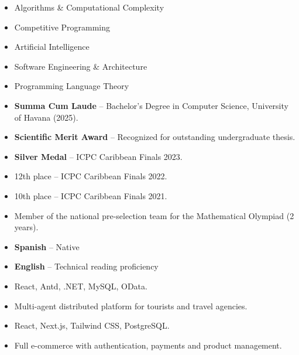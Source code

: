 

\begin{itemize}
    \item Algorithms \& Computational Complexity
    \item Competitive Programming
    \item Artificial Intelligence
    \item Software Engineering \& Architecture
    \item Programming Language Theory
\end{itemize}


\begin{itemize}
    \item \textbf{Summa Cum Laude} -- Bachelor's Degree in Computer Science, University of Havana (2025).
    \item \textbf{Scientific Merit Award} -- Recognized for outstanding undergraduate thesis.
    \item \textbf{Silver Medal} -- ICPC Caribbean Finals 2023.
    \item 12th place -- ICPC Caribbean Finals 2022.
    \item 10th place -- ICPC Caribbean Finals 2021.
    \item Member of the national pre-selection team for the Mathematical Olympiad (2 years).
\end{itemize}


\begin{itemize}
    \item \textbf{Spanish} -- Native
    \item \textbf{English} -- Technical reading proficiency
\end{itemize}


\begin{itemize}
    \item React, Antd, .NET, MySQL, OData.
    \item Multi-agent distributed platform for tourists and travel agencies.
\end{itemize}

\divider

\begin{itemize}
    \item React, Next.js, Tailwind CSS, PostgreSQL.
    \item Full e-commerce with authentication, payments and product management.
\end{itemize}



\medskip
